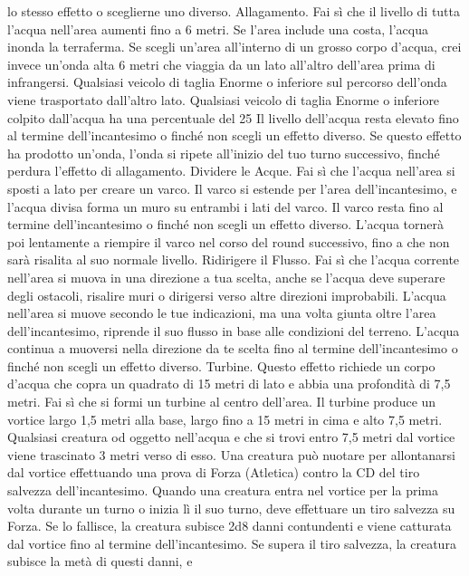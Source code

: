 \begin{multicols}{2}
lo stesso effetto o sceglierne uno diverso.
Allagamento. Fai sì che il livello di tutta l’acqua
nell’area aumenti fino a 6 metri. Se l’area include una
costa, l’acqua inonda la terraferma.
Se scegli un’area all’interno di un grosso corpo d’acqua,
crei invece un’onda alta 6 metri che viaggia da un lato
all’altro dell’area prima di infrangersi. Qualsiasi veicolo
di taglia Enorme o inferiore sul percorso dell’onda viene
trasportato dall’altro lato. Qualsiasi veicolo di taglia
Enorme o inferiore colpito dall’acqua ha una
percentuale del 25%
Il livello dell’acqua resta elevato fino al termine
dell’incantesimo o finché non scegli un effetto diverso.
Se questo effetto ha prodotto un’onda, l’onda si ripete
all’inizio del tuo turno successivo, finché perdura
l’effetto di allagamento.
Dividere le Acque. Fai sì che l’acqua nell’area si sposti
a lato per creare un varco. Il varco si estende per l’area
dell’incantesimo, e l’acqua divisa forma un muro su
entrambi i lati del varco. Il varco resta fino al termine
dell’incantesimo o finché non scegli un effetto diverso.
L’acqua tornerà poi lentamente a riempire il varco nel
corso del round successivo, fino a che non sarà risalita
al suo normale livello.
Ridirigere il Flusso. Fai sì che l’acqua corrente
nell’area si muova in una direzione a tua scelta, anche
se l’acqua deve superare degli ostacoli, risalire muri o
dirigersi verso altre direzioni improbabili. L’acqua
nell’area si muove secondo le tue indicazioni, ma una
volta giunta oltre l’area dell’incantesimo, riprende il suo 
flusso in base alle condizioni del terreno. L’acqua
continua a muoversi nella direzione da te scelta fino al
termine dell’incantesimo o finché non scegli un effetto
diverso.
Turbine. Questo effetto richiede un corpo d’acqua che
copra un quadrato di 15 metri di lato e abbia una
profondità di 7,5 metri. Fai sì che si formi un turbine al
centro dell’area. Il turbine produce un vortice largo 1,5
metri alla base, largo fino a 15 metri in cima e alto 7,5
metri. Qualsiasi creatura od oggetto nell’acqua e che si
trovi entro 7,5 metri dal vortice viene trascinato 3 metri
verso di esso. Una creatura può nuotare per
allontanarsi dal vortice effettuando una prova di Forza
(Atletica) contro la CD del tiro salvezza
dell’incantesimo.
Quando una creatura entra nel vortice per la prima volta
durante un turno o inizia lì il suo turno, deve effettuare
un tiro salvezza su Forza. Se lo fallisce, la creatura
subisce 2d8 danni contundenti e viene catturata dal
vortice fino al termine dell’incantesimo. Se supera il tiro
salvezza, la creatura subisce la metà di questi danni, e

\end{multicols}
